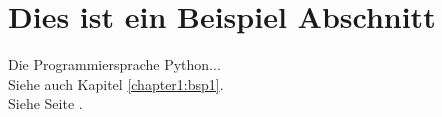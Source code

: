 \section{Dies ist ein Beispiel Abschnitt}



Die Programmiersprache Python... \cite{Pilgrim2009} \\

Siehe auch Kapitel \ref{chapter1:bsp1}. \\

Siehe Seite \pageref{chapter1:bsp1}.
